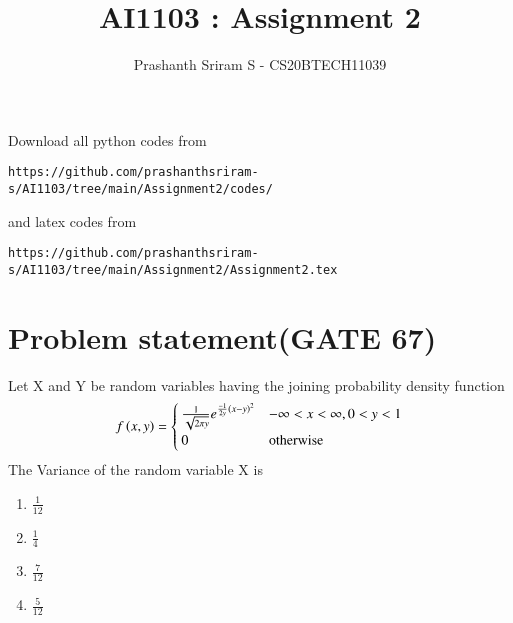 \documentclass[journal,12pt,twocolumn]{IEEEtran}
\begin{document}
     \def\rightbox#1{\makebox[0in][r]{#1}}
     \def\centbox#1{\makebox[0in]{#1}}
     \def\topbox#1{\raisebox{-\baselineskip}[0in][0in]{#1}}
     \def\midbox#1{\raisebox{-0.5\baselineskip}[0in][0in]{#1}}
\vspace{3cm}
\title{AI1103 : Assignment 2}
\author{Prashanth Sriram S - CS20BTECH11039}
\maketitle
\newpage
\bigskip
\renewcommand{\thefigure}{\theenumi}
\renewcommand{\thetable}{\theenumi}
Download all python codes from 
\begin{lstlisting}
https://github.com/prashanthsriram-s/AI1103/tree/main/Assignment2/codes/
\end{lstlisting}
%
and latex codes from 
%
\begin{lstlisting}
https://github.com/prashanthsriram-s/AI1103/tree/main/Assignment2/Assignment2.tex
\end{lstlisting}
\section*{\textbf{Problem statement(GATE 67)}}
Let X and Y be random variables having the joining probability density function
\begin{align}
f\left(x,y\right)=
\begin{cases}
\frac{1}{\sqrt{2\pi y}}e^{\frac{-1}{2y}\left(x-y\right)^2} &-\infty<x<\infty,0<y<1\\
0 &\text{otherwise}
\end{cases}
\end{align}
The Variance of the random variable X is\\
\begin{enumerate}[label=\alph*)]
\item $\frac{1}{12}$ \\
\item $\frac{1}{4}$ \\
\item $\frac{7}{12}$ \\
\item $\frac{5}{12}$ \\
\end{enumerate}
\end{document}
